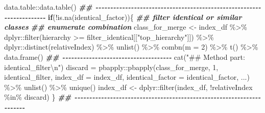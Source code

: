 \documentclass[
]{article}
\newenvironment{Shaded}{\begin{snugshade}}{\end{snugshade}}
\newcommand{\AttributeTok}[1]{\textcolor[rgb]{0.77,0.63,0.00}{#1}}
\newcommand{\ControlFlowTok}[1]{\textcolor[rgb]{0.13,0.29,0.53}{\textbf{#1}}}
\newcommand{\DecValTok}[1]{\textcolor[rgb]{0.00,0.00,0.81}{#1}}
\newcommand{\DocumentationTok}[1]{\textcolor[rgb]{0.56,0.35,0.01}{\textbf{\textit{#1}}}}
\newcommand{\FunctionTok}[1]{\textcolor[rgb]{0.00,0.00,0.00}{#1}}
\newcommand{\NormalTok}[1]{#1}
\newcommand{\OtherTok}[1]{\textcolor[rgb]{0.56,0.35,0.01}{#1}}
\newcommand{\SpecialCharTok}[1]{\textcolor[rgb]{0.00,0.00,0.00}{#1}}
\newcommand{\StringTok}[1]{\textcolor[rgb]{0.31,0.60,0.02}{#1}}
\begin{document}
\begin{Shaded}
\begin{Highlighting}[]
\NormalTok{      data.table}\SpecialCharTok{::}\FunctionTok{data.table}\NormalTok{()}
    \DocumentationTok{\#\# {-}{-}{-}{-}{-}{-}{-}{-}{-}{-}{-}{-}{-}{-}{-}{-}{-}{-}{-}{-}{-}{-}{-}{-}{-}{-}{-}{-}{-}{-}{-}{-}{-}{-}{-}{-}{-}{-}{-}{-}{-}{-}{-}{-}{-}{-}{-}{-}{-}{-}{-}{-}{-}{-}{-}{-}{-}{-}{-}{-}{-}{-}{-}{-}{-}{-}{-}{-}{-}{-} }
    \ControlFlowTok{if}\NormalTok{(}\SpecialCharTok{!}\FunctionTok{is.na}\NormalTok{(identical\_factor))\{}
      \DocumentationTok{\#\# filter identical or similar classes}
      \DocumentationTok{\#\# enumerate combination}
\NormalTok{      class\_for\_merge }\OtherTok{\textless{}{-}}\NormalTok{ index\_df }\SpecialCharTok{\%\textgreater{}\%} 
\NormalTok{        dplyr}\SpecialCharTok{::}\FunctionTok{filter}\NormalTok{(hierarchy }\SpecialCharTok{\textgreater{}=}\NormalTok{ filter\_identical[[}\StringTok{"top\_hierarchy"}\NormalTok{]]) }\SpecialCharTok{\%\textgreater{}\%}
\NormalTok{        dplyr}\SpecialCharTok{::}\FunctionTok{distinct}\NormalTok{(relativeIndex) }\SpecialCharTok{\%\textgreater{}\%}
        \FunctionTok{unlist}\NormalTok{() }\SpecialCharTok{\%\textgreater{}\%} \FunctionTok{combn}\NormalTok{(}\AttributeTok{m =} \DecValTok{2}\NormalTok{) }\SpecialCharTok{\%\textgreater{}\%}
        \FunctionTok{t}\NormalTok{() }\SpecialCharTok{\%\textgreater{}\%} \FunctionTok{data.frame}\NormalTok{()}
      \DocumentationTok{\#\# {-}{-}{-}{-}{-}{-}{-}{-}{-}{-}{-}{-}{-}{-}{-}{-}{-}{-}{-}{-}{-}{-}{-}{-}{-}{-}{-}{-}{-}{-}{-}{-}{-}{-}{-}{-}{-} }
      \FunctionTok{cat}\NormalTok{(}\StringTok{"\#\# Method part: identical\_filter}\SpecialCharTok{\textbackslash{}n}\StringTok{"}\NormalTok{)}
\NormalTok{      discard }\OtherTok{=}\NormalTok{ pbapply}\SpecialCharTok{::}\FunctionTok{pbapply}\NormalTok{(class\_for\_merge, }\DecValTok{1}\NormalTok{, identical\_filter,}
                                 \AttributeTok{index\_df =}\NormalTok{ index\_df,}
                                 \AttributeTok{identical\_factor =}\NormalTok{ identical\_factor,}
\NormalTok{                                 ...) }\SpecialCharTok{\%\textgreater{}\%}
        \FunctionTok{unlist}\NormalTok{() }\SpecialCharTok{\%\textgreater{}\%} \FunctionTok{unique}\NormalTok{()}
\NormalTok{      index\_df }\OtherTok{\textless{}{-}}\NormalTok{ dplyr}\SpecialCharTok{::}\FunctionTok{filter}\NormalTok{(index\_df, }\SpecialCharTok{!}\NormalTok{relativeIndex }\SpecialCharTok{\%in\%}\NormalTok{ discard)}
\NormalTok{    \}}
    \DocumentationTok{\#\# {-}{-}{-}{-}{-}{-}{-}{-}{-}{-}{-}{-}{-}{-}{-}{-}{-}{-}{-}{-}{-}{-}{-}{-}{-}{-}{-}{-}{-}{-}{-}{-}{-}{-}{-}{-}{-}{-}{-}{-}{-}{-}{-}{-}{-}{-}{-}{-}{-}{-}{-}{-}{-}{-}{-}{-}{-}{-}{-}{-}{-}{-}{-}{-}{-}{-}{-}{-}{-}{-} }

\end{Highlighting}
\end{Shaded}
\end{document}

